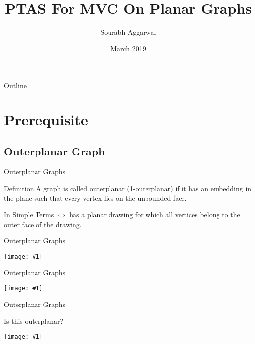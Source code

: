 \documentclass{beamer}
\title{PTAS For MVC On Planar Graphs}
\author{Sourabh Aggarwal}
\institute[IIT Palakkad] %
{
  Department of Computer Science And Engineering\\
  IIT Palakkad
}
\date{March 2019}
\newcommand{\ph}[1]{
    \texttt{[image: \#1]}
}
\begin{document}
\begin{frame}
  \titlepage
\end{frame}

\begin{frame}{Outline}
  \tableofcontents
\end{frame}

\section{Prerequisite}

\subsection{Outerplanar Graph}

\begin{frame}{Outerplanar Graphs}
\begin{block}{Definition}
    A graph is called outerplanar (1-outerplanar) if it has an embedding in the plane such that every vertex lies on the unbounded face.
\end{block}
\begin{block}{In Simple Terms}
    $\Leftrightarrow$ has a planar drawing for which all vertices belong to the outer face of the drawing.
\end{block}
\end{frame}
\begin{frame}{Outerplanar Graphs}
\begin{example}
    \ph{o1}
\end{example}
\end{frame}

\begin{frame}{Outerplanar Graphs}
\begin{example}
    \ph{o2}
\end{example}
\end{frame}

\begin{frame}{Outerplanar Graphs}
\begin{example}
    Is this outerplanar?

    \ph{o3}


\end{example}
\end{frame}
    
\end{document}
